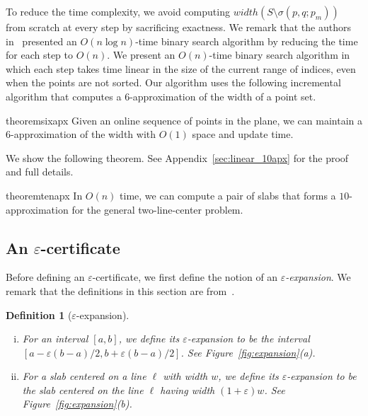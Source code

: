 \documentclass[10pt,a4paper]{article}
\newtheorem{definition}[theorem]{Definition}
\theoremstyle{star}
\theoremstyle{claimstar}
\newcommand{\eps}{\ensuremath{\varepsilon}}
\begin{document}
To reduce the time complexity, we avoid computing ${width}(S \setminus \sigma(p, q; p_m))$ from scratch at every step by sacrificing exactness.  
We remark that the authors in~\cite{agarwalTwo} presented an $O(n \log n)$-time 
binary search algorithm by reducing the time for each step to $O(n)$. 
We present an $O(n)$-time binary search algorithm in which each step 
takes time linear in the size of the current range of indices, even when the points are not sorted.
Our algorithm uses the following incremental algorithm that computes a $6$-approximation of the width of a point set.


\begin{restatable}{theorem}{sixapx}
    \label{thm:6apx}
    Given an online sequence of points in the plane, we can maintain a $6$-approximation of the width with $O(1)$ space and update time.
\end{restatable}



We show the following theorem. See Appendix~\ref{sec:linear_10apx} for the proof and full details.

\begin{restatable}{theorem}{tenapx}
    \label{thm:10apx}
    In $O(n)$ time, we can compute a pair of slabs that forms a $10$-approximation for the general two-line-center problem.
\end{restatable}

\subsection{An \texorpdfstring{$\eps$}{epsilon}-certificate}
\label{sec:eps_certificate}


Before defining an $\eps$-certificate, we first define the notion of an \emph{$\eps$-expansion}.
We remark that the definitions in this section are from~\cite{agarwal2005approximation}.

\begin{definition}[$\eps$-expansion]
\begin{enumerate}[(i)]
    \item For an interval $[a, b]$, 
    we define its \emph{$\eps$-expansion} to be the interval $[a- \eps(b-a)/2, b + \eps(b-a)/2]$. See Figure~\ref{fig:expansion}(a).
    \item For a slab centered on a line $\ell$ with width $w$,
    we define its \emph{$\eps$-expansion} to be the slab centered on the line $\ell$ having width  $(1+ \eps) w$.
    See Figure~\ref{fig:expansion}(b).
\end{enumerate}
\end{definition}
\end{document}
